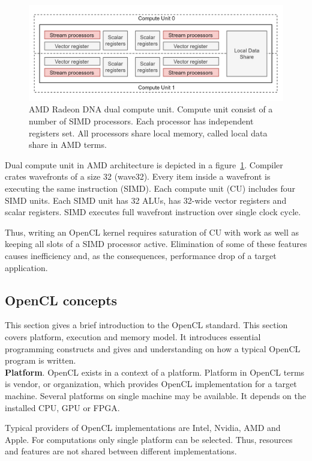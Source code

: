 \begin{figure}[h]
    \centering
    \includegraphics[width=1.0\textwidth]{images/rdna_dcu.png}
    \caption{AMD Radeon DNA dual compute unit. Compute unit consist of a number of SIMD processors. Each processor has independent registers set. All processors share local memory, called local data share in AMD terms.}
    \label{fig:rdna_dcu}
\end{figure}

Dual compute unit in AMD architecture is depicted in a figure~\ref{fig:rdna_dcu}. Compiler crates wavefronts of a size 32 (wave32). Every item inside a wavefront is executing the same instruction (SIMD). Each compute unit (CU) includes four SIMD units. Each SIMD unit has 32 ALUs, has 32-wide vector registers and scalar registers. SIMD executes full wavefront instruction over single clock cycle.

Thus, writing an OpenCL kernel requires saturation of CU with work as well as keeping all slots of a SIMD processor active. Elimination of some of these features causes inefficiency and, as the consequences, performance drop of a target application.

\subsection{OpenCL concepts}

This section gives a brief introduction to the OpenCL standard. This section covers platform, execution and memory model. It introduces essential programming constructs and gives and understanding on how a typical OpenCL program is written.\\

\textbf{Platform}. OpenCL exists in a context of a platform. Platform in OpenCL terms is vendor, or organization, which provides OpenCL implementation for a target machine. Several platforms on single machine may be available. It depends on the installed CPU, GPU or FPGA. 

Typical providers of OpenCL implementations are Intel, Nvidia, AMD and Apple. For computations only single platform can be selected. Thus, resources and features are not shared between different implementations.

